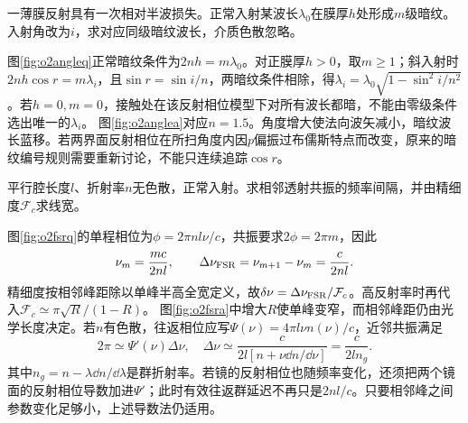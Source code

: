 \begin{exercise}\label{ex:o2filmangle}
一薄膜反射具有一次相对半波损失。正常入射某波长$\lambda_0$在膜厚$h$处形成$m$级暗纹。入射角改为$i$，求对应同级暗纹波长，介质色散忽略。
\end{exercise}
\begin{solution}
图\ref{fig:o2angleq}正常暗纹条件为$2nh=m\lambda_0$。对正膜厚$h>0$，取$m\geq1$；斜入射时$2nh\cos r=m\lambda_i$，且$\sin r=\sin i/n$，两暗纹条件相除，得$\lambda_i=\lambda_0\sqrt{1-\sin^2i/n^2}$。若$h=0,m=0$，接触处在该反射相位模型下对所有波长都暗，不能由零级条件选出唯一的$\lambda_i$。
图\ref{fig:o2anglea}对应$n=1.5$。角度增大使法向波矢减小，暗纹波长蓝移。若两界面反射相位在所扫角度内因$p$偏振过布儒斯特点而改变，原来的暗纹编号规则需要重新讨论，不能只连续追踪$\cos r$。
\end{solution}

\begin{exercise}\label{ex:o2freespectral}
平行腔长度$l$、折射率$n$无色散，正常入射。求相邻透射共振的频率间隔，并由精细度$\mathcal F_c$求线宽。
\end{exercise}
\begin{solution}
图\ref{fig:o2fsrq}的单程相位为$\phi=2\pi nl\nu/c$，共振要求$2\phi=2\pi m$，因此
\[
 \nu_m=\frac{mc}{2nl},\qquad
 \Delta\nu_{\rm FSR}=\nu_{m+1}-\nu_m=\frac c{2nl}.
\]
精细度按相邻峰距除以单峰半高全宽定义，故$\delta\nu=\Delta\nu_{\rm FSR}/\mathcal F_c$。高反射率时再代入$\mathcal F_c\simeq\pi\sqrt R/(1-R)$。
图\ref{fig:o2fsra}中增大$R$使单峰变窄，而相邻峰距仍由光学长度决定。若$n$有色散，往返相位应写$\Psi(\nu)=4\pi l\nu n(\nu)/c$，近邻共振满足
\[
 2\pi\simeq\Psi'(\nu)\Delta\nu,
 \quad \Delta\nu\simeq\frac{c}{2l[n+\nu\dd n/\dd\nu]}
 =\frac c{2ln_g}.
\]
其中$n_g=n-\lambda\dd n/\dd\lambda$是群折射率。若镜的反射相位也随频率变化，还须把两个镜面的反射相位导数加进$\Psi'$；此时有效往返群延迟不再只是$2nl/c$。只要相邻峰之间参数变化足够小，上述导数法仍适用。
\end{solution}

